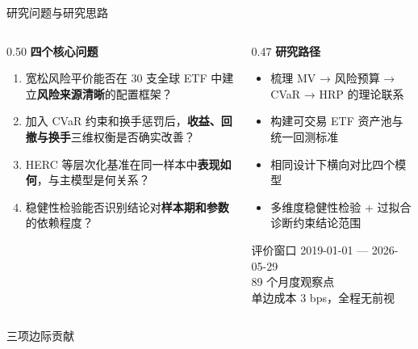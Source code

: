 \documentclass[aspectratio=169,11pt]{beamer}
\newcommand{\etfCount}{30}
\newcommand{\evalStartDate}{2019-01-01}
\newcommand{\evalEndDate}{2026-05-29}
\newcommand{\evalMonths}{89}
\newcommand{\txCostBps}{3}
\begin{document}
\begin{frame}{研究问题与研究思路}
  \begin{columns}[T]
    \begin{column}{0.50\textwidth}
      \textbf{四个核心问题}
      \begin{enumerate}
        \item 宽松风险平价能否在 \etfCount{} 支全球 ETF 中建立\textbf{风险来源清晰}的配置框架？
        \item 加入 CVaR 约束和换手惩罚后，\textbf{收益、回撤与换手}三维权衡是否确实改善？
        \item HERC 等层次化基准在同一样本中\textbf{表现如何}，与主模型是何关系？
        \item 稳健性检验能否识别结论对\textbf{样本期和参数}的依赖程度？
      \end{enumerate}
    \end{column}
    \begin{column}{0.47\textwidth}
      \textbf{研究路径}
      \begin{itemize}
        \item[\textcolor{swufeGold}{$\triangleright$}] 梳理 MV → 风险预算 → CVaR → HRP 的理论联系
        \item[\textcolor{swufeGold}{$\triangleright$}] 构建可交易 ETF 资产池与统一回测标准
        \item[\textcolor{swufeGold}{$\triangleright$}] 相同设计下横向对比四个模型
        \item[\textcolor{swufeGold}{$\triangleright$}] 多维度稳健性检验 + 过拟合诊断约束结论范围
      \end{itemize}
      \vspace{0.5em}
      \begin{block}{评价窗口}
        \centering\small
        \evalStartDate{} — \evalEndDate{}\\
        \evalMonths{} 个月度观察点\\
        单边成本 \txCostBps{} bps，全程无前视
      \end{block}
    \end{column}
  \end{columns}
\end{frame}

\begin{frame}{三项边际贡献}
  \begin{swufekeypoints}
  \end{swufekeypoints}
\end{frame}
\end{document}
